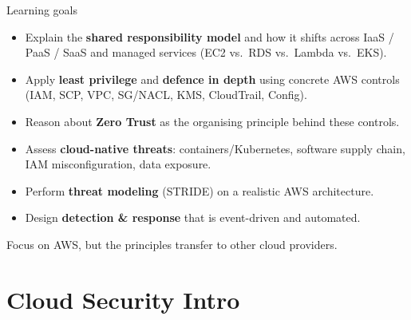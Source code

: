 \documentclass[aspectratio=169,10pt]{beamer}
\newcommand{\term}[1]{{\color{awsink}\textbf{#1}}}
\begin{document}
\begin{frame}{Learning goals}
  \begin{itemize}
    \item Explain the \term{shared responsibility model} and how it shifts across
          IaaS / PaaS / SaaS and managed services (EC2 vs.\ RDS vs.\ Lambda vs.\ EKS).
    \item Apply \term{least privilege} and \term{defence in depth} using concrete
          AWS controls (IAM, SCP, VPC, SG/NACL, KMS, CloudTrail, Config).
    \item Reason about \term{Zero Trust} as the organising principle behind these controls.
    \item Assess \term{cloud-native threats}: containers/Kubernetes, software supply chain,
          IAM misconfiguration, data exposure.
    \item Perform \term{threat modeling} (STRIDE) on a realistic AWS architecture.
    \item Design \term{detection \& response} that is event-driven and automated.
  \end{itemize}
  \vfill
  {\footnotesize\color{midgray}Focus on AWS, but the principles transfer to other cloud providers.}
\end{frame}

\section{Cloud Security Intro}
\end{document}
